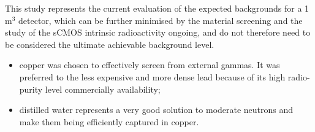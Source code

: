 \documentclass[physics,article,submit,moreauthors,pdftex]{Definitions/mdpi}
\begin{document}
This study represents the current evaluation of the expected backgrounds for a 1 m$^3$ detector, which can be further minimised by the material screening and the study of the sCMOS intrinsic radioactivity ongoing, and do not therefore need to be considered the ultimate achievable background level.






\begin{itemize}
~    \item copper was chosen to effectively screen from external gammas. It was preferred to the less expensive and more dense lead because of its high radio-purity level commercially availability;
    \item distilled water represents a very good solution to moderate neutrons and make them being efficiently captured in copper.
\end{itemize}
\end{document}

